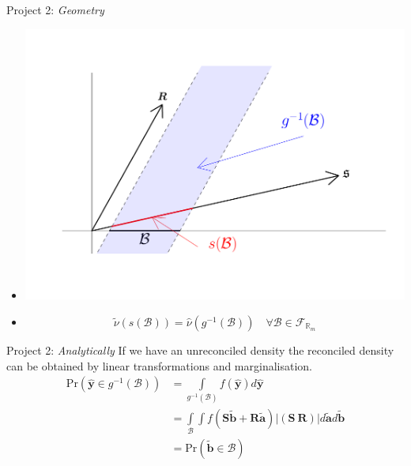 \documentclass[11pt,xcolor=dvipsnames,table]{beamer} %
\begin{document}
\begin{frame}{Project 2: \textit{Geometry}}
\begin{itemize}
	\item[]
	\vspace{-0.5cm}
	\centering
	\includegraphics[scale=0.5]{Figs/probforerec_schematic.pdf}
	\item[]\begin{equation*}
	\tilde{\nu}(s(\mathcal{B}))=\hat{\nu}(g^{-1}(\mathcal{B}))\quad\forall \mathcal{B}\in\mathcal{F}_{\mathbb{R}_m}
	\end{equation*} 
\end{itemize}    
\end{frame}



  \begin{frame}{Project 2: \textit{Analytically}}
If we have an unreconciled density the reconciled density can be obtained by linear transformations and marginalisation.
\begin{align*}
\mbox{Pr}(\hat{\bm{y}}\in g^{-1}(\mathcal{B}))&=\int\limits_{g^{-1}(\mathcal{B})}f(\hat{\bm{y}})d\hat{\bm{y}}\\
&=\int\limits_{\mathcal{B}}\int f(\bm{S}\tilde{\bm{b}}+\bm{R}\tilde{\bm{a}})|\left(\bm{S}~\bm{R}\right)|d\tilde{\bm{a}}d\tilde{\bm{b}}\\
&=\mbox{Pr}(\tilde{\bm{b}}\in \mathcal{B})
\end{align*}
\end{frame}



\end{document}
